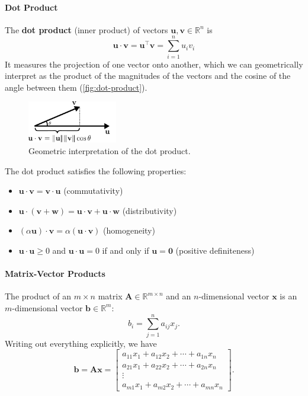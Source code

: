 \paragraph*{Dot Product}
The \textbf{dot product} (inner product) of vectors $ \mathbf{u}, \mathbf{v} \in \mathbb{R}^n $ is
\begin{equation*}
    \mathbf{u}\cdot\mathbf{v} = \mathbf{u}^\top \mathbf{v} = \sum_{i=1}^n u_i v_i
\end{equation*}
It measures the projection of one vector onto another, which we can geometrically interpret as the product of the magnitudes of the vectors and the cosine of the angle between them (\autoref{fig:dot-product}). 

\begin{figure}[H]
    \centering
    \includegraphics[width=0.35\textwidth]{figs/linear-algebra/dot-product.pdf}
    \caption{Geometric interpretation of the dot product.}
    \label{fig:dot-product}
\end{figure}

The dot product satisfies the following properties:
\begin{itemize}
    \item $ \mathbf{u} \cdot \mathbf{v} = \mathbf{v} \cdot \mathbf{u} $ (commutativity)
    \item $ \mathbf{u} \cdot (\mathbf{v} + \mathbf{w}) = \mathbf{u} \cdot \mathbf{v} + \mathbf{u} \cdot \mathbf{w} $ (distributivity)
    \item $ (\alpha \mathbf{u}) \cdot \mathbf{v} = \alpha (\mathbf{u} \cdot \mathbf{v}) $ (homogeneity)
    \item $ \mathbf{u} \cdot \mathbf{u} \geq 0 $ and $ \mathbf{u} \cdot \mathbf{u} = 0 $ if and only if $ \mathbf{u} = \mathbf{0} $ (positive definiteness)
\end{itemize}

\paragraph*{Matrix-Vector Products}
The product of an $m\times n$ matrix $ \mathbf{A} \in\mathbb{R}^{m\times n}$ and an $n$-dimensional vector $ \mathbf{x} $ is an $m$-dimensional vector $\mathbf{b}\in \mathbb{R}^m $:
\begin{equation*}
  b_i = \sum_{j=1}^n a_{ij} x_j.
\end{equation*}
Writing out everything explicitly, we have
\begin{equation*}
  \mathbf{b} = \mathbf{A}\mathbf{x} = \begin{bmatrix}
    a_{11}x_1 + a_{12}x_2 + \cdots + a_{1n}x_n \\
    a_{21}x_1 + a_{22}x_2 + \cdots + a_{2n}x_n \\
    \vdots \\
    a_{m1}x_1 + a_{m2}x_2 + \cdots + a_{mn}x_n
  \end{bmatrix}.
\end{equation*}

